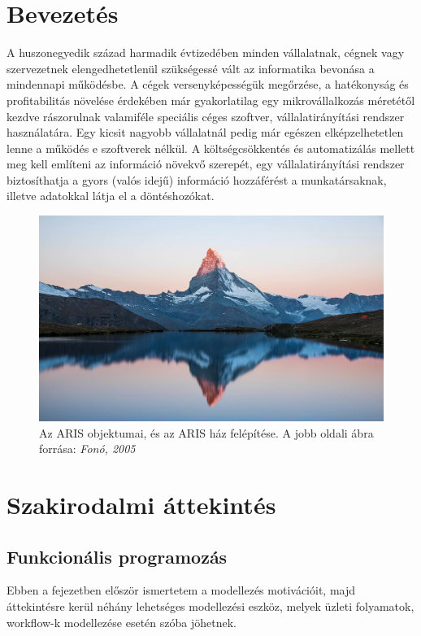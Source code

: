 \documentclass[12pt]{article}
\begin{document}
\section*{Bevezetés}

A huszonegyedik század harmadik évtizedében minden vállalatnak, cégnek vagy szervezetnek elengedhetetlenül szükségessé vált az informatika bevonása a mindennapi működésbe. A cégek versenyképességük megőrzése, a hatékonyság és profitabilitás növelése érdekében már gyakorlatilag egy mikrovállalkozás méretétől kezdve rászorulnak valamiféle speciális céges szoftver, vállalatirányítási rendszer használatára. Egy kicsit nagyobb vállalatnál pedig már egészen elképzelhetetlen lenne a működés e szoftverek nélkül. A költségcsökkentés és automatizálás mellett meg kell említeni az információ növekvő szerepét, egy vállalatirányítási rendszer biztosíthatja a gyors (valós idejű) információ hozzáférést a munkatársaknak, illetve adatokkal látja el a döntéshozókat.

\begin{figure}
\includegraphics[width=\textwidth]{testimg}
\caption{Az ARIS objektumai, és az ARIS ház felépítése. A jobb oldali ábra forrása:  \textit{Fonó, 2005}}
\end{figure}

\newpage
\section{Szakirodalmi áttekintés}

\subsection{Funkcionális programozás}
Ebben a fejezetben először ismertetem a modellezés motivációit, majd áttekintésre kerül néhány lehetséges modellezési eszköz, melyek üzleti folyamatok, workflow-k modellezése esetén szóba jöhetnek. \cite{AR}
\end{document}
